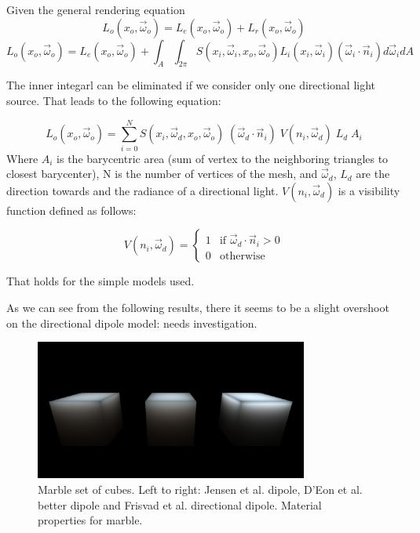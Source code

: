\documentclass[12pt, twoside,a4paper, landscape]{article}
\begin{document}
Given the general rendering equation
$$
L_o(x_o, \vec{\omega}_o) = L_e(x_o, \vec{\omega}_o) + L_r(x_o, \vec{\omega}_o)  
$$
$$
L_o(x_o, \vec{\omega}_o) = L_e(x_o, \vec{\omega}_o) + \int_A \int_{2 \pi} S(x_i, \vec{\omega}_i, x_o, \vec{\omega}_o) L_i(x_i, \vec{\omega}_i) (\vec{\omega}_i \cdot \vec{n}_i) d \vec{\omega}_i dA 
$$

The inner integarl can be eliminated if we consider only one directional light source. That leads to the following equation:

$$
L_o(x_o, \vec{\omega}_o) = \sum_{i = 0}^{N} S(x_i, \vec{\omega}_d, x_o, \vec{\omega}_o)\; (\vec{\omega}_d \cdot \vec{n}_i) \; V(n_i,\vec{\omega}_d) \;L_d \;A_i 
$$
Where $A_i$ is the barycentric area (sum of vertex to the neighboring triangles to closest barycenter), N is the number of vertices of the mesh, and $\vec{\omega}_d$, $L_d$ are the direction towards and the radiance of a directional light. $V(n_i,\vec{\omega}_d)$ is a visibility function defined as follows:

\begin{equation}
V(n_i,\vec{\omega}_d) = \begin{cases} 1 &\mbox{if } \vec{\omega}_d \cdot \vec{n}_i > 0 \\ 
0 & \mbox{otherwise } \end{cases} 
\end{equation}

That holds for the simple models used.

As we can see from the following results, there it seems to be a slight overshoot on the directional dipole model: needs investigation.


\begin{figure}[here]
\centering
\includegraphics[width=0.8\textwidth]{marblecubes}
\caption{Marble set of cubes. Left to right: Jensen et al. dipole, D'Eon et al. better dipole and Frisvad et al. directional dipole. Material properties for marble.}
\end{figure}
\end{document}
